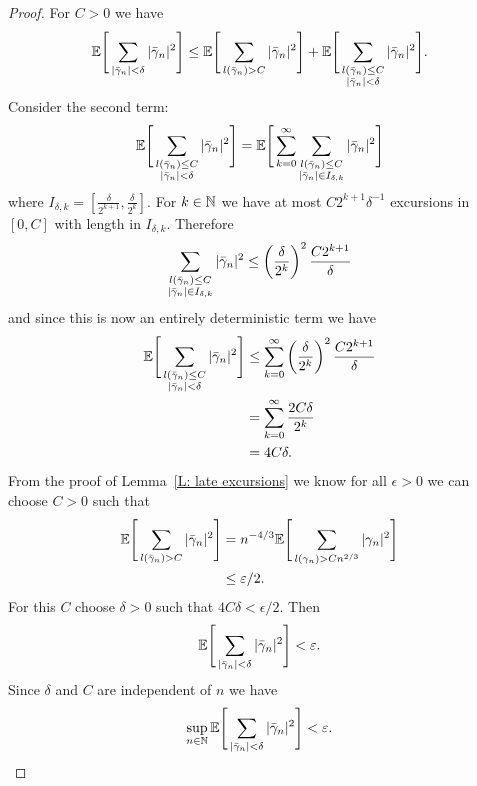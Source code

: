 \begin{proof}
	For $C > 0$ we have
	\begin{equation*}
		\mathbb{E}\Bigg[\sum_{|\bar{\gamma}_n| < \delta} |\bar{\gamma}_n|^2\Bigg]
		\leq \mathbb{E}\Bigg[\sum_{l(\bar{\gamma}_n) > C} |\bar{\gamma}_n|^2\Bigg] 
		+ \mathbb{E}\Bigg[\sum_{\substack{l(\bar{\gamma}_n) \leq C \\ |\bar{\gamma}_n| < \delta}} |\bar{\gamma}_n|^2\Bigg].
	\end{equation*}
	Consider the second term:
	\begin{equation*}
		\mathbb{E}\Bigg[\sum_{\substack{l(\bar{\gamma}_n) \leq C \\ |\bar{\gamma}_n| < \delta}} |\bar{\gamma}_n|^2\Bigg]
		= \mathbb{E}\Bigg[\sum_{k = 0}^{\infty} \sum_{\substack{l(\bar{\gamma}_n) \leq C \\ |\bar{\gamma}_n| \in I_{\delta, k}}} |\bar{\gamma}_n|^2\Bigg]
	\end{equation*}
	where $I_{\delta, k} = [ \frac{\delta}{2^{k+1}}, \frac{\delta}{2^{k}} ]$.
	For $k \in \mathbb{N}$ we have at most $C2^{k+1}\delta^{-1}$ excursions in $[0, C]$ with length in $I_{\delta, k}$.
	Therefore
	\begin{equation*}
		\sum_{\substack{l(\bar{\gamma}_n) \leq C \\ |\bar{\gamma}_n| \in I_{\delta, k}}} |\bar{\gamma}_n|^2 
		\leq \left(\frac{\delta}{2^k}\right)^2 \frac{C2^{k+1}}{\delta}
	\end{equation*}
	and since this is now an entirely deterministic term we have
	\begin{equation*}
	\begin{aligned}
	\mathbb{E}\Bigg[\sum_{\substack{l(\bar{\gamma}_n) \leq C \\ |\bar{\gamma}_n| < \delta}} |\bar{\gamma}_n|^2\Bigg] 
	&\leq \sum_{k = 0}^{\infty} \left(\frac{\delta}{2^k}\right)^2 \frac{C2^{k+1}}{\delta} \\
	&= \sum_{k = 0}^{\infty} \frac{2C\delta}{2^k} \\
	&= 4C\delta.
	\end{aligned}
	\end{equation*}
	From the proof of Lemma~\ref{L: late excursions} we know for all $\epsilon > 0$ we can choose $C > 0$ such that 
	\begin{equation*}
	\begin{aligned}
	\mathbb{E}\Bigg[ \sum_{l(\bar{\gamma}_n) > C} |\bar{\gamma}_n|^2 \Bigg] 
	&= n^{-4 / 3}\mathbb{E}\Bigg[ \sum_{l(\gamma_n) > Cn^{2 / 3}} |\gamma_n|^2 \Bigg] \\
	&\leq \varepsilon / 2.
	\end{aligned}
	\end{equation*}
	For this $C$ choose $\delta > 0$ such that $4C\delta < \epsilon/2$.
	Then
	\begin{equation*}
		\mathbb{E}\Bigg[\sum_{|\bar{\gamma}_n| < \delta} |\bar{\gamma}_n|^2\Bigg]  < \varepsilon.
	\end{equation*}
	Since $\delta$ and $C$ are independent of $n$ we have
	\begin{equation*}
	\sup_{n \in \mathbb{N}} \mathbb{E}\Bigg[\sum_{|\bar{\gamma}_n| < \delta} |\bar{\gamma}_n|^2\Bigg] < \varepsilon. 
	\end{equation*}
\end{proof}

